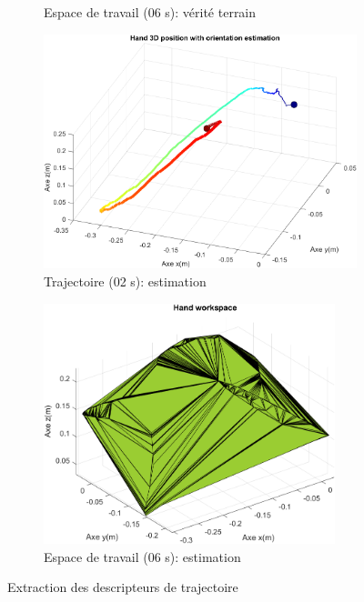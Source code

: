 \documentclass[5pt]{article}
\begin{document}
\begin{figure}[H]
\begin{subfigure}{0.5\textwidth}
        \caption{Espace de travail (06 s): vérité terrain}
        \label{subfig:workspace_ref}
    \end{subfigure}

    \begin{subfigure}{0.5\textwidth}
        \centering
        \includegraphics[width=\linewidth]{../results/mvt_1_3d_esmin.png}
        \caption{Trajectoire (02 s): estimation }
        \label{subfig:traj_es}
    \end{subfigure}
    \begin{subfigure}{0.5\textwidth}
        \centering
        \includegraphics[width=\linewidth, height=7cm]{../results/workspace_est_min.png}
        \caption{Espace de travail (06 s): estimation}
        \label{subfig:workspace_est}
    \end{subfigure}

    \caption{Extraction des descripteurs de trajectoire}
    \label{fig:hand_mvt}
\end{figure}
\end{document}
